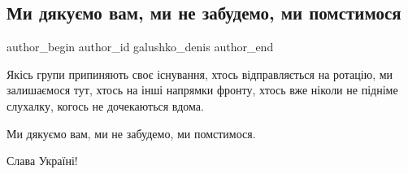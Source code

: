  
 
 
 
 

\subsection{Ми дякуємо вам, ми не забудемо, ми помстимося}
\label{sec:08_12_2022.fb.galushko_denis.1.mi_dyaku_mo_vam__mi_}

\ifcmt
 author_begin
   author_id galushko_denis
 author_end
\fi

Якісь групи припиняють своє існування, хтось відправляється на ротацію, ми
залишаємося тут, хтось на інші напрямки фронту, хтось вже ніколи не підніме
слухалку, когось не дочекаються вдома.

Ми дякуємо вам, ми не забудемо, ми помстимося.

Слава Україні!
